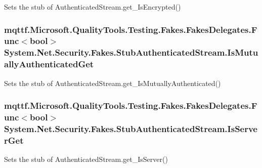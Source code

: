 Sets the stub of Authenticated\-Stream.\-get\-\_\-\-Is\-Encrypted()

\hypertarget{class_system_1_1_net_1_1_security_1_1_fakes_1_1_stub_authenticated_stream_aef261d7fa39200c1a988b08cc1833fbc}{
\subsubsection[{Is\-Mutually\-Authenticated\-Get}]{\setlength{\rightskip}{0pt plus 5cm}mqttf.\-Microsoft.\-Quality\-Tools.\-Testing.\-Fakes.\-Fakes\-Delegates.\-Func$<$bool$>$ System.\-Net.\-Security.\-Fakes.\-Stub\-Authenticated\-Stream.\-Is\-Mutually\-Authenticated\-Get}}\label{class_system_1_1_net_1_1_security_1_1_fakes_1_1_stub_authenticated_stream_aef261d7fa39200c1a988b08cc1833fbc}


Sets the stub of Authenticated\-Stream.\-get\-\_\-\-Is\-Mutually\-Authenticated()

\hypertarget{class_system_1_1_net_1_1_security_1_1_fakes_1_1_stub_authenticated_stream_a2a88efd9bac2f9551ad3cd73d0b023ca}{
\subsubsection[{Is\-Server\-Get}]{\setlength{\rightskip}{0pt plus 5cm}mqttf.\-Microsoft.\-Quality\-Tools.\-Testing.\-Fakes.\-Fakes\-Delegates.\-Func$<$bool$>$ System.\-Net.\-Security.\-Fakes.\-Stub\-Authenticated\-Stream.\-Is\-Server\-Get}}\label{class_system_1_1_net_1_1_security_1_1_fakes_1_1_stub_authenticated_stream_a2a88efd9bac2f9551ad3cd73d0b023ca}


Sets the stub of Authenticated\-Stream.\-get\-\_\-\-Is\-Server()

